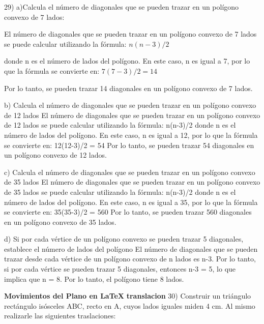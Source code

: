 \documentclass{article}
\begin{document}
29) a)Calcula el número de diagonales que se pueden trazar en un polígono convexo de 7 lados:

El número de diagonales que se pueden trazar en un polígono convexo de 7 lados se puede calcular utilizando la fórmula:
$n(n-3)/2$

donde n es el número de lados del polígono. En este caso, n es igual a 7, por lo que la fórmula se convierte en:
$7(7-3)/2 = 14$

Por lo tanto, se pueden trazar 14 diagonales en un polígono convexo de 7 lados.

b) Calcula el número de diagonales que se pueden trazar en un polígono convexo de 12 lados
El número de diagonales que se pueden trazar en un polígono convexo de 12 lados se puede calcular utilizando la fórmula:  n(n-3)/2  donde n es el número de lados del polígono. En este caso, n es igual a 12, por lo que la fórmula se convierte en:  12(12-3)/2 = 54  Por lo tanto, se pueden trazar 54 diagonales en un polígono convexo de 12 lados.


c) Calcula el número de diagonales que se pueden trazar en un polígono convexo de 35 lados
El número de diagonales que se pueden trazar en un polígono convexo de 35 lados se puede calcular utilizando la fórmula:  n(n-3)/2  donde n es el número de lados del polígono. En este caso, n es igual a 35, por lo que la fórmula se convierte en:  35(35-3)/2 = 560  Por lo tanto, se pueden trazar 560 diagonales en un polígono convexo de 35 lados.

d) Si por cada vértice de un polígono convexo se pueden trazar 5 diagonales, establece el número de lados del
polígono
El número de diagonales que se pueden trazar desde cada vértice de un polígono convexo de n lados es n-3. Por lo tanto, si por cada vértice se pueden trazar 5 diagonales, entonces n-3 = 5, lo que implica que n = 8. Por lo tanto, el polígono tiene 8 lados.

{\LARGE \textbf{Movimientos del Plano en \LaTeX}}
{\large \textbf{translacion}}
30) Construir un triángulo rectángulo isósceles ABC, recto en A, cuyos lados iguales miden 4 cm. Al mismo realizarle las siguientes traslaciones:
\end{document}
